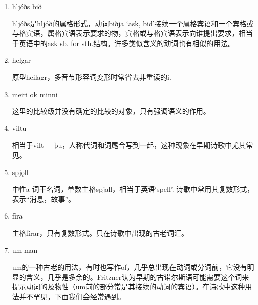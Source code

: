 \begin{grammar*}{}
    \begin{enumerate}[leftmargin=*]
        \item hljóðs bið

              hljóðs是hljóð的属格形式，动词biðja `ask, bid'接续一个属格宾语和一个宾格或与格宾语，属格宾语表示要求的物，宾格或与格宾语表示向谁提出要求，相当于英语中的ask sb. for sth.结构。许多类似含义的动词也有相似的用法。

        \item helgar

              原型heilagr，多音节形容词变形时常省去非重读的i.

        \item meiri ok minni

              这里的比较级并没有确定的比较的对象，只有强调语义的作用。

        \item viltu

              相当于vilt + þu，人称代词和词尾合写到一起，这种现象在早期诗歌中尤其常见。

        \item spjǫll

              中性a-词干名词，单数主格spjall，相当于英语`spell'. 诗歌中常用其复数形式，表示“消息，故事”。
        \item fíra

              主格fírar，只有复数形式。只在诗歌中出现的古老词汇。
        \item um man

              um的一种古老的用法，有时也写作of，几乎总出现在动词或分词前，它没有明显的含义，几乎是多余的。Fritzner认为早期的古诺尔斯语可能需要这个词来提示动词的及物性（um前的部分常是其接续的动词的宾语）。在诗歌中这种用法并不罕见，下面我们会经常遇到。
    \end{enumerate}
\end{grammar*}
\hspace*{\fill}\\ %
